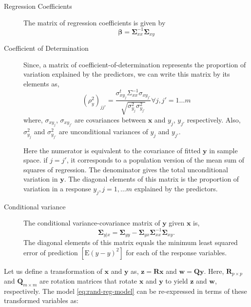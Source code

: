 \documentclass[review]{elsarticle}
\theoremstyle{definition}
\theoremstyle{definition}
\theoremstyle{definition}
\theoremstyle{remark}
\begin{document}
\begin{description}
\item[Regression Coefficients]
The matrix of regression coefficients is given by
\[\boldsymbol{\beta} = \boldsymbol{\Sigma}_{xx}^{-1}\boldsymbol{\Sigma}_{xy}\]
\item[Coefficient of Determination]
Since, a matrix of coefficient-of-determination represents the
proportion of variation explained by the predictors, we can write this
matrix by its elements as, \[
\left(\rho_y^2\right)_{jj'} =
\frac{\sigma_{xy_j}^t\Sigma_{xx}^{-1}\sigma_{xy_{j'}}}
    {\sqrt{\sigma_{y_j}^2\sigma_{y_{j'}}^2}} \forall j, j' = 1 \ldots m
\] where, \(\sigma_{xy_j}\), \(\sigma_{xy_{j'}}\) are covariances
between \(\mathbf{x}\) and \(y_j\), \(y_{j'}\) respectively. Also,
\(\sigma_{y_j}^2\) and \(\sigma_{y_{j'}}^2\) are unconditional variances
of \(y_j\) and \(y_{j'}\).

Here the numerator is equivalent to the covariance of fitted
\(\mathbf{y}\) in sample space. if \(j = j'\), it corresponds to a
population version of the mean sum of squares of regression. The
denominator gives the total unconditional variation in \(\mathbf{y}\).
The diagonal elements of this matrix is the proportion of variation in a
response \(y_j, j = 1, \ldots m\) explained by the predictors.
\item[Conditional variance]
The conditional variance-covariance matrix of \(\mathbf{y}\) given
\(\mathbf{x}\) is,
\[\boldsymbol{\Sigma}_{y|x} = \boldsymbol{\Sigma}_{yy} - \boldsymbol{\Sigma}_{yx}\boldsymbol{\Sigma}_{xx}^{-1}\boldsymbol{\Sigma}_{xy}.\]
The diagonal elements of this matrix equals the minimum least squared
error of prediction \(\left[\mathrm{E}(y - \hat{y})^2\right]\) for each
of the response variables.
\end{description}

Let us define a transformation of \(\mathbf{x}\) and \(\mathbf{y}\) as,
\(\mathbf{z} = \mathbf{Rx}\) and \(\mathbf{w} = \mathbf{Qy}\). Here,
\(\mathbf{R}_{p\times p}\) and \(\mathbf{Q}_{m\times m}\) are rotation
matrices that rotate \(\mathbf{x}\) and \(\mathbf{y}\) to yield
\(\mathbf{z}\) and \(\mathbf{w}\), respectively. The model
\eqref{eq:rand-reg-model} can be re-expressed in terms of these
transformed variables as:
\end{document}
